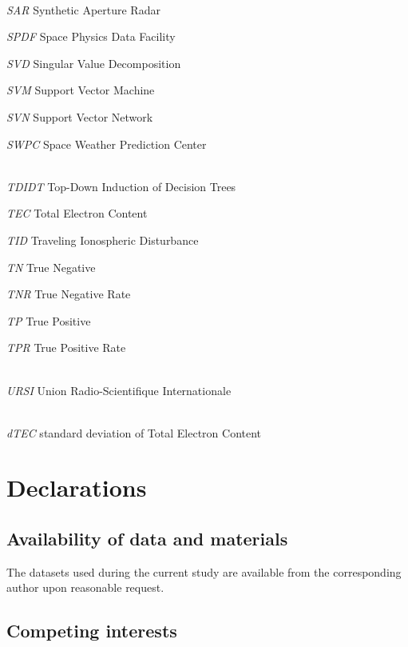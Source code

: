 \let\LaTeXcline\cline\documentclass[sn-mathphys-num]{sn-jnl}\let\cline\LaTeXcline
\begin{document}
\\[2\baselineskip]

\textit{SAR} Synthetic Aperture Radar

\textit{SPDF} Space Physics Data Facility

\textit{SVD} Singular Value Decomposition

\textit{SVM} Support Vector Machine

\textit{SVN} Support Vector Network

\textit{SWPC} Space Weather Prediction Center


\\[2\baselineskip]

\textit{TDIDT} Top-Down Induction of Decision Trees

\textit{TEC} Total Electron Content

\textit{TID} Traveling Ionospheric Disturbance

\textit{TN} True Negative

\textit{TNR} True Negative Rate

\textit{TP} True Positive

\textit{TPR} True Positive Rate


\\[2\baselineskip]

\textit{URSI} Union Radio-Scientifique Internationale


\\[2\baselineskip]

\textit{dTEC} standard deviation of Total Electron Content



\section{Declarations}

\subsection{Availability of data and materials}

The datasets used during the current study are available from the corresponding author upon reasonable request.

\subsection{Competing interests}
\end{document}
